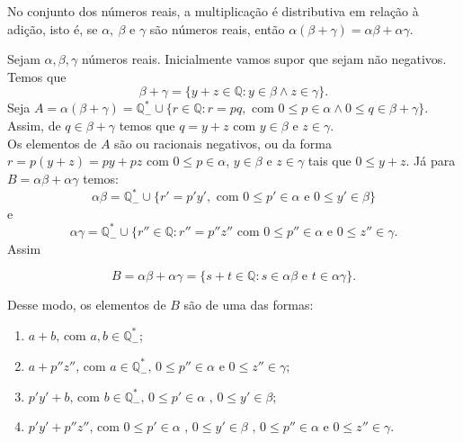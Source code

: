 \documentclass[../main.tex]{subfiles}
\begin{document}
\begin{prop}\label{reais-prop-produtoDistributivo}
    No conjunto dos números reais, a multiplicação é distributiva em relação à adição, isto é, se $\alpha,\ \beta$ e $\gamma$ são números reais, então 
    $\alpha(\beta + \gamma) = \alpha\beta+\alpha\gamma$.
\end{prop}
\begin{dem}
    Sejam $\alpha, \beta, \gamma$ números reais. Inicialmente vamos supor que sejam não negativos. Temos que 
    \[ \beta + \gamma = \{ y+z \in \mathbb{Q} : y \in \beta \land z \in \gamma \} .\]
    Seja $A = \alpha(\beta+\gamma) = \mathbb{Q}^*_{-} \cup \{ r \in \mathbb{Q} : r = pq, \text{ com } 0 \leq p \in \alpha \land 0 \leq q \in \beta + \gamma \}$. \\
    Assim, de $q \in \beta + \gamma$ temos que $q = y + z$ com $y \in \beta$ e $z \in \gamma$. \\
    Os elementos de $A$ são ou racionais negativos, ou da forma $r = p(y+z) = py + pz$ com $0 \leq p \in \alpha$, $y \in \beta$ e $z \in \gamma$ tais que $0 \leq y + z$. 
    Já para $B = \alpha\beta + \alpha\gamma$ temos: 
    \[ \alpha\beta = \mathbb{Q}^*_{-} \cup \{ r'= p'y', \text{ com } 0 \leq p' \in \alpha \text{ e } 0 \leq y' \in \beta \} \]
    e
    \[ \alpha \gamma = \mathbb{Q}^*_{-} \cup \{ r'' \in \mathbb{Q} : r'' = p''z'' \text{ com } 0 \leq p'' \in \alpha \text{ e } 0 \leq z'' \in \gamma .\]
    Assim
    
    \[ B = \alpha \beta + \alpha \gamma = \{ s+t \in \mathbb{Q} : s \in \alpha \beta \text{ e } t \in \alpha \gamma \} . \]

    Desse modo, os elementos de $B$ são de uma das formas:
    \begin{enumerate}[label=(\roman*), ref={forma~(\roman*)}]\label{reais-dummy-charBFormas}
        \item\label{reais-dummy-charBa} $a + b \text{, com } a, b \in \mathbb{Q}^*_{-}$; 
        \item\label{reais-dummy-charBb} $a + p''z''\text{, com }a \in \mathbb{Q}^*_{-} \text{, } 0 \leq p'' \in \alpha \text{ e }0 \leq z'' \in \gamma$; 
        \item\label{reais-dummy-charBc} $p'y' + b\text{, com }b \in \mathbb{Q}^*_{-} \text{, } 0 \leq p' \in \alpha \text{ , } 0 \leq y' \in \beta$; 
        \item\label{reais-dummy-charBd} $p'y' + p''z''\text{, com }0 \leq p' \in  \alpha \text{ , } 0 \leq y' \in \beta \text{ , } 0 \leq p'' \in \alpha\text{ e }0 \leq z'' \in \gamma$.
    \end{enumerate}


\end{dem}
\end{document}
